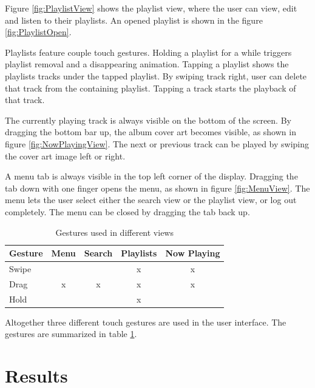\documentclass[conference]{IEEEtran}
\begin{document}
Figure \ref{fig:PlaylistView} shows the playlist view, where the user can view, edit and listen to their playlists. An opened playlist is shown in the figure \ref{fig:PlaylistOpen}.

Playlists feature couple touch gestures. Holding a playlist for a while triggers playlist removal and a disappearing animation. Tapping a playlist shows the playlists tracks under the tapped playlist. By swiping track right, user can delete that track from the containing playlist. Tapping a track starts the playback of that track.

The currently playing track is always visible on the bottom of the screen. By dragging the bottom bar up, the album cover art becomes visible, as shown in figure \ref{fig:NowPlayingView}. The next or previous track can be played by swiping the cover art image left or right. 

A menu tab is always visible in the top left corner of the display.
Dragging the tab down with one finger opens the menu, as shown in figure \ref{fig:MenuView}. The menu lets the user select either the search view or the playlist view, or log out completely. The menu can be closed by dragging the tab back up.

\begin{table}[htbp]
    \centering
    \begin{tabular}{|l | c | c | c | c |}
        \hline
         Gesture & Menu & Search & Playlists & Now Playing \\ \hline
         Swipe &   &   & x & x \\ \hline
         Drag  & x & x & x & x \\ \hline
         Hold  &   &   & x &   \\ \hline
    \end{tabular}
    \caption{Gestures used in different views}
    \label{tab:Gestures}
\end{table}

Altogether three different touch gestures are used in the user interface.
The gestures are summarized in table \ref{tab:Gestures}.








\section{Results}
\end{document}

